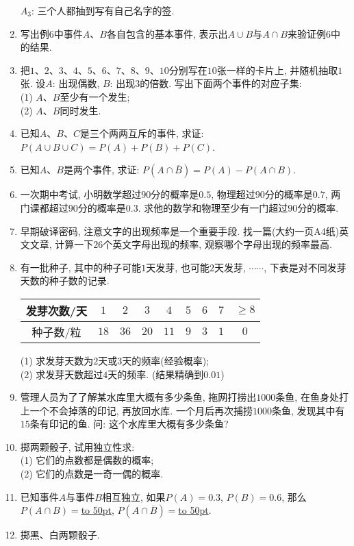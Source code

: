 \documentclass[10pt,a4paper]{article}
\newcommand{\blank}[1]{\underline{\hbox to #1pt{}}}
\begin{document}
\begin{enumerate}[1.]
$A_3$: 三个人都抽到写有自己名字的签.
\item 写出例$6$中事件$A$、$B$各自包含的基本事件, 表示出$A\cup B$与$A\cap B$来验证例$6$中的结果.
\item 把$1$、$2$、$3$、$4$、$5$、$6$、$7$、$8$、$9$、$10$分别写在$10$张一样的卡片上, 并随机抽取$1$张. 设$A$: 出现偶数, $B$: 出现$3$的倍数. 写出下面两个事件的对应子集:\\
(1) $A$、$B$至少有一个发生;\\
(2) $A$、$B$同时发生. 
\item 已知$A$、$B$、$C$是三个两两互斥的事件, 求证: $P(A\cup B\cup C)=P(A)+P(B)+P(C)$.
\item 已知$A$、$B$是两个事件, 求证: $P(A\cap \overline B)=P(A)-P(A\cap B)$.
\item 一次期中考试, 小明数学超过$90$分的概率是$0.5$, 物理超过$90$分的概率是$0.7$, 两门课都超过$90$分的概率是$0.3$. 求他的数学和物理至少有一门超过$90$分的概率.
\item 早期破译密码, 注意文字的出现频率是一个重要手段. 找一篇(大约一页A4纸)英文文章, 计算一下$26$个英文字母出现的频率, 观察哪个字母出现的频率最高.
\item 有一批种子, 其中的种子可能$1$天发芽, 也可能$2$天发芽, $\cdots\cdots$, 下表是对不同发芽天数的种子数的记录.
\begin{center}
\begin{tabular}{|c|c|c|c|c|c|c|c|c|}
    \hline
    发芽次数/天 & $1$ & $2$ & $3$ & $4$ & $5$ & $6$ & $7$ & $\ge 8$\\ \hline
    种子数/粒 & $18$ & $36$ & $20$ & $11$ & $9$ & $3$ & $1$ & $0$ \\ \hline
\end{tabular}
\end{center}
(1) 求发芽天数为$2$天或$3$天的频率(经验概率);\\
(2) 求发芽天数超过$4$天的频率. (结果精确到$0.01$)
\item 管理人员为了了解某水库里大概有多少条鱼, 拖网打捞出$1000$条鱼, 在鱼身处打上一个不会掉落的印记, 再放回水库. 一个月后再次捕捞$1000$条鱼, 发现其中有$15$条有印记的鱼. 问: 这个水库里大概有多少条鱼?
\item 掷两颗骰子, 试用独立性求:\\
(1) 它们的点数都是偶数的概率;\\
(2) 它们的点数是一奇一偶的概率.
\item 已知事件$A$与事件$B$相互独立, 如果$P(A)=0.3$, $P(B)=0.6$, 那么$P(A\cap B)=$\blank{50}, $P(A\cap \overline{B})=$\blank{50}.
\item 掷黑、白两颗骰子.\\

\end{enumerate}
\end{document}
